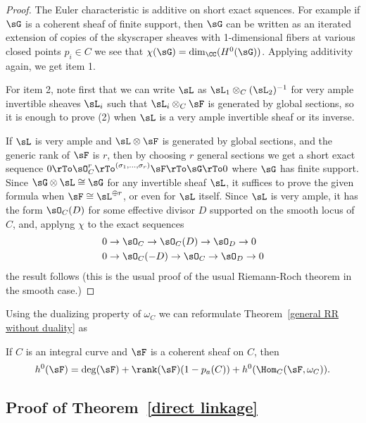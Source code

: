 \begin{proof}
The Euler characteristic is additive on short exact squences. For example if $\sG$ is a coherent sheaf of finite support, then $\sG$ can be written as an iterated extension of
copies of the skyscraper sheaves with 1-dimensional fibers at various closed points $p_i\in C$ we see that $\chi(\sG) = \dim_\CC(H^0(\sG))$. Applying additivity again, we get item 1.

For item 2, note first that we can write $\sL$ as $\sL_1\otimes_C(\sL_2)^{-1}$ for very ample invertible sheaves
$\sL_i$ such that $\sL_i\otimes_C\sF$ is generated by global sections, so it is enough to prove (2) when $\sL$ is
a very ample invertible sheaf or its inverse. 

If $\sL$ is very ample and $\sL\otimes \sF$ is generated by global sections,
and the generic rank of $\sF$ is $r$, then by choosing $r$ general sections we get a short exact sequence
$0\rTo \sO_C^r \rTo^{(\sigma_1,\dots, \sigma_r)}\sF \rTo \sG\rTo 0$
where $\sG$ has finite support. Since $\sG \otimes \sL \cong \sG$ for any invertible sheaf $\sL$, it suffices to 
prove the given formula when $\sF \cong \sL^{\oplus r}$, or even for $\sL$ itself. Since $\sL$ is very ample,
it has the form $\sO_C(D)$ for some effective divisor $D$ supported on the smooth locus of $C$, 
and, applyng $\chi$ to the exact sequences 
$$ 
\begin{aligned}
&0\to \sO_C \to \sO_C(D)  \to \sO_D \to 0\\
&0\to \sO_C(-D) \to \sO_C  \to \sO_D \to 0\\
\end{aligned}
$$
the result follows (this is the usual proof of the usual Riemann-Roch theorem in the smooth case.)
\end{proof}

Using the dualizing property of $\omega_C$ we can reformulate Theorem~\ref{general RR without duality} as
\begin{theorem}\label{general RR with duality}
If $C$ is an integral curve and $\sF$ is a coherent sheaf on $C$, then
$$
h^0(\sF) = \deg(\sF) + \rank(\sF)(1-p_a(C)) + h^0(\Hom_C(\sF, \omega_C)).
$$
\end{theorem}



\subsection{Proof of Theorem~\ref{direct linkage}}

